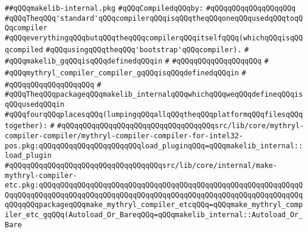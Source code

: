 \label{src/lib/core/internal/makelib-internal.pkg}
\verb|##qQQqmakelib-internal.pkg|\newline
\newline
\verb|#qQQqCompiledqQQqby:|\newline
\verb|#qQQqqQQqqQQqqQQqqQQq|\newline
\newline
\newline
\verb|#qQQqTheqQQq'standard'qQQqcompilerqQQqisqQQqtheqQQqoneqQQqusedqQQqtoqQQqcompiler|\newline
\verb|#qQQqeverythingqQQqbutqQQqtheqQQqcompilerqQQqitselfqQQq(whichqQQqisqQQqcompiled|\newline
\verb|#qQQqusingqQQqtheqQQq'bootstrap'qQQqcompiler).|\newline
\verb|#|\newline
\verb|#qQQqmakelib_gqQQqisqQQqdefinedqQQqin|\newline
\verb|#|\newline
\verb|#qQQqqQQqqQQqqQQqqQQq|\newline
\verb|#|\newline
\verb|#qQQqmythryl_compiler_compiler_gqQQqisqQQqdefinedqQQqin|\newline
\verb|#|\newline
\verb|#qQQqqQQqqQQqqQQqqQQq|\newline
\verb|#|\newline
\verb|#qQQqTheqQQqpackageqQQqmakelib_internalqQQqwhichqQQqweqQQqdefineqQQqisqQQqusedqQQqin|\newline
\verb|#qQQqfourqQQqplacesqQQq(lumpingqQQqallqQQqtheqQQqplatformqQQqfilesqQQqtogether):|\newline
\verb|#|\newline
\verb|#qQQqqQQqqQQqqQQqqQQqqQQqqQQqqQQqqQQqsrc/lib/core/mythryl-compiler-compiler/mythryl-compiler-compiler-for-intel32-pos.pkg:qQQqqQQqqQQqqQQqqQQqqQQqload_pluginqQQq=qQQqmakelib_internal::load_plugin|\newline
\verb|#qQQqqQQqqQQqqQQqqQQqqQQqqQQqqQQqqQQqsrc/lib/core/internal/make-mythryl-compiler-etc.pkg:qQQqqQQqqQQqqQQqqQQqqQQqqQQqqQQqqQQqqQQqqQQqqQQqqQQqqQQqqQQqqQQqqQQqqQQqqQQqqQQqqQQqqQQqqQQqqQQqqQQqqQQqqQQqqQQqqQQqqQQqqQQqqQQqqQQqqQQqqQQqpackageqQQqmake_mythryl_compiler_etcqQQq=qQQqmake_mythryl_compiler_etc_gqQQq(Autoload_Or_BareqQQq=qQQqmakelib_internal::Autoload_Or_Bare|\newline
